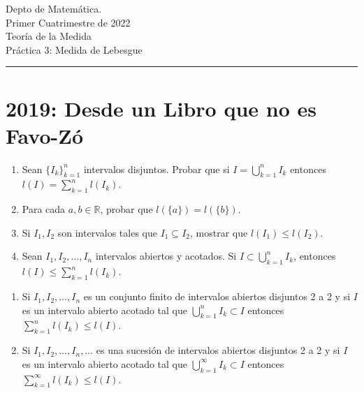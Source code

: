\documentclass{book}
\newcommand{\rr}{\mathbb{R}}
\begin{document}


\begin{large}
\begin{bfseries} %
        \noindent Depto de Matem\'atica.\\
        Primer Cuatrimestre de 2022\\                                                                                                                                                                                                                                                                                                                                                
        Teoría de la Medida \\
        Práctica 3: Medida de Lebesgue

\end{bfseries}
\end{large}
\par\noindent\rule{\textwidth}{.5pt}









\section{2019: Desde un Libro que no es Favo-Z\'o}




\begin{ejer}{} 
\begin{enumerate}
\item
Sean $\{I_k\}_{k=1}^n$ intervalos disjuntos.  
Probar que si $I=\bigcup\limits_{k=1}^n I_k$ entonces $l(I)=\sum\limits_{k=1}^n l(I_k)$.
\item Para cada $a,b\in \rr$, probar que $l(\{a\})=l(\{b\})$.
\item Si $I_1, I_2$ son intervalos tales que $I_1\subseteq I_2$, mostrar que $l(I_1)\leq l(I_2)$.
\item Sean $I_1,I_2,\dots,I_n$ intervalos abiertos y acotados. 
Si $I\subset \bigcup\limits_{k=1}^n I_k$, entonces $l(I)\leq \sum\limits_{k=1}^n l(I_k)$.
\end{enumerate}
\end{ejer}



\begin{ejer}{} 
\begin{enumerate}
\item Si $I_1,I_2,\dots,I_n$ es un conjunto finito de intervalos abiertos disjuntos 2 a 2 y si 
$I$ es un intervalo abierto acotado  tal que $\bigcup\limits_{k=1}^n I_k\subset I$ entonces
$\sum\limits_{k=1}^n l(I_k) \leq l(I).$
\item Si $I_1,I_2,\dots,I_n,\dots$ es una sucesión de intervalos abiertos disjuntos 2 a 2 y si 
$I$ es un intervalo abierto acotado  tal que $\bigcup\limits_{k=1}^{\infty} I_k\subset I$ entonces
$\sum\limits_{k=1}^{\infty} l(I_k) \leq l(I).$
\end{enumerate}
\end{ejer}  
\end{document}
